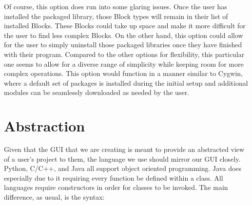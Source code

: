 \documentclass[journal,10pt,onecolumn,compsoc]{IEEEtran} \usepackage[margin=1.0in]{geometry} \usepackage{pdfpages} \usepackage{graphicx}
\begin{document}
Of course, this option does run into some glaring issues. 
Once the user has installed the packaged library, those Block types will remain in their list of installed Blocks. 
These Blocks could take up space and make it more difficult for the user to find less complex Blocks. 
On the other hand, this option could allow for the user to simply uninstall those packaged libraries once they have finished with their program. 
Compared to the other options for flexibility, this particular one seems to allow for a diverse range of simplicity while keeping room for more complex operations. 
This option would function in a manner similar to Cygwin, where a default set of packages is installed during the initial setup and additional modules can be seamlessly downloaded as needed by the user. \cite{moody}
\newpage

\section{Abstraction}

Given that the GUI that we are creating is meant to provide an abstracted view of a user's project to them, the language we use should mirror our GUI closely.
Python, C/C++, and Java all support object oriented programming. 
Java does especially due to it requiring every function be defined within a class.
All languages require constructors in order for classes to be invoked. 
The main difference, as usual, is the syntax:
\end{document}
